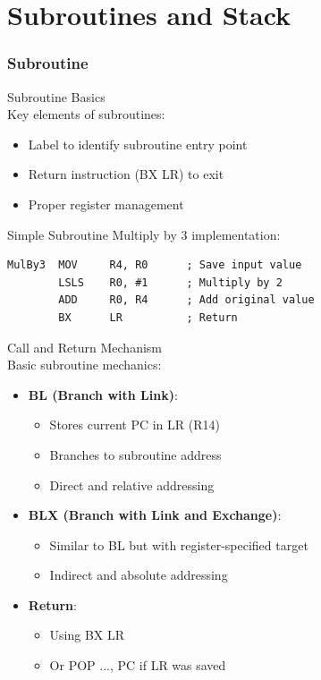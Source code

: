 \section{Subroutines and Stack}

\subsubsection{Subroutine}

\begin{concept}{Subroutine Basics}\\
Key elements of subroutines:
\begin{itemize}
  \item Label to identify subroutine entry point
  \item Return instruction (BX LR) to exit
  \item Proper register management
\end{itemize}
\end{concept}

\begin{example2}{Simple Subroutine}
Multiply by 3 implementation:
\begin{lstlisting}[language=armasm, style=basesmol]
MulBy3  MOV     R4, R0      ; Save input value
        LSLS    R0, #1      ; Multiply by 2
        ADD     R0, R4      ; Add original value
        BX      LR          ; Return
\end{lstlisting}
\end{example2}

\begin{concept}{Call and Return Mechanism}\\
Basic subroutine mechanics:
\begin{itemize}
  \item \textbf{BL (Branch with Link)}:
    \begin{itemize}
      \item Stores current PC in LR (R14)
      \item Branches to subroutine address
      \item Direct and relative addressing
    \end{itemize}
  \item \textbf{BLX (Branch with Link and Exchange)}:
    \begin{itemize}
      \item Similar to BL but with register-specified target
      \item Indirect and absolute addressing
    \end{itemize}
  \item \textbf{Return}:
    \begin{itemize}
      \item Using BX LR
      \item Or POP {..., PC} if LR was saved
    \end{itemize}
\end{itemize}
\end{concept}

